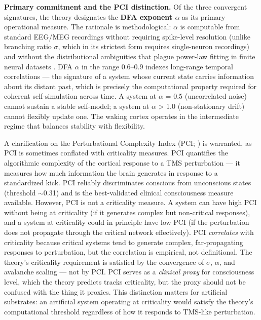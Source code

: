 \documentclass[12pt]{article}
\newcommand{\revstart}{}
\newcommand{\revend}{}
\begin{document}
{\revstart\textbf{Primary commitment and the PCI distinction.} Of the three convergent signatures, the theory designates the \textbf{DFA exponent $\alpha$} as its primary operational measure. The rationale is methodological: $\alpha$ is computable from standard EEG/MEG recordings without requiring spike-level resolution (unlike branching ratio $\sigma$, which in its strictest form requires single-neuron recordings) and without the distributional ambiguities that plague power-law fitting in finite neural datasets \citep{ClausetShaliziNewman2009}. DFA $\alpha$ in the range 0.6--0.9 indexes long-range temporal correlations --- the signature of a system whose current state carries information about its distant past, which is precisely the computational property required for coherent self-simulation across time. A system at $\alpha$ = 0.5 (uncorrelated noise) cannot sustain a stable self-model; a system at $\alpha$ > 1.0 (non-stationary drift) cannot flexibly update one. The waking cortex operates in the intermediate regime that balances stability with flexibility.

A clarification on the Perturbational Complexity Index (PCI; \citealp{Casali2013}) is warranted, as PCI is sometimes conflated with criticality measures. PCI quantifies the algorithmic complexity of the cortical response to a TMS perturbation --- it measures how much information the brain generates in response to a standardized kick. PCI reliably discriminates conscious from unconscious states (threshold $\sim$0.31) and is the best-validated clinical consciousness measure available. However, PCI is not a criticality measure. A system can have high PCI without being at criticality (if it generates complex but non-critical responses), and a system at criticality could in principle have low PCI (if the perturbation does not propagate through the critical network effectively). PCI \emph{correlates} with criticality because critical systems tend to generate complex, far-propagating responses to perturbation, but the correlation is empirical, not definitional. The theory's criticality requirement is satisfied by the convergence of $\sigma$, $\alpha$, and avalanche scaling --- not by PCI. PCI serves as a \emph{clinical proxy} for consciousness level, which the theory predicts tracks criticality, but the proxy should not be confused with the thing it proxies. This distinction matters for artificial substrates: an artificial system operating at criticality would satisfy the theory's computational threshold regardless of how it responds to TMS-like perturbation.\revend}
\end{document}
